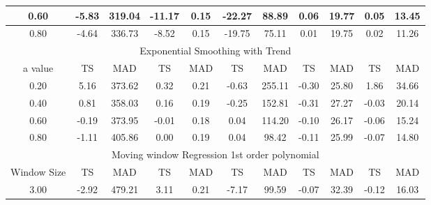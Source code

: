\documentclass[conference,onecolumn]{IEEEtran}
\begin{document}
\begin{table}[ht]
\begin{tabular}{|c|c|c|c|c|c|c|c|c|c|c|}
0.60        & -5.83            & 319.04           & -11.17             & 0.15            & -22.27          & 88.89          & 0.06             & 19.77           & 0.05             & 13.45            \\ \hline
0.80        & -4.64            & 336.73           & -8.52              & 0.15            & -19.75          & 75.11          & 0.01             & 19.75           & 0.02             & 11.26            \\ \hline
\multicolumn{11}{|c|}{Exponential Smoothing with Trend}                                                                                                                                                \\ \hline
a value     & TS               & MAD              & TS                 & MAD             & TS              & MAD            & TS               & MAD             & TS               & MAD              \\ \hline
0.20        & 5.16             & 373.62           & 0.32               & 0.21            & -0.63           & 255.11         & -0.30            & 25.80           & 1.86             & 34.66            \\ \hline
0.40        & 0.81             & 358.03           & 0.16               & 0.19            & -0.25           & 152.81         & -0.31            & 27.27           & -0.03            & 20.14            \\ \hline
0.60        & -0.19            & 373.95           & -0.01              & 0.18            & 0.04            & 114.20         & -0.10            & 26.17           & -0.06            & 15.24            \\ \hline
0.80        & -1.11            & 405.86           & 0.00               & 0.19            & 0.04            & 98.42          & -0.11            & 25.99           & -0.07            & 14.80            \\ \hline
\multicolumn{11}{|c|}{Moving window Regression 1st order polynomial}                                                                                                                                   \\ \hline
Window Size & TS               & MAD              & TS                 & MAD             & TS              & MAD            & TS               & MAD             & TS               & MAD              \\ \hline
3.00        & -2.92            & 479.21           & 3.11               & 0.21            & -7.17           & 99.59          & -0.07            & 32.39           & -0.12            & 16.03            \\ \hline

\end{tabular}
\end{table}
\end{document}
